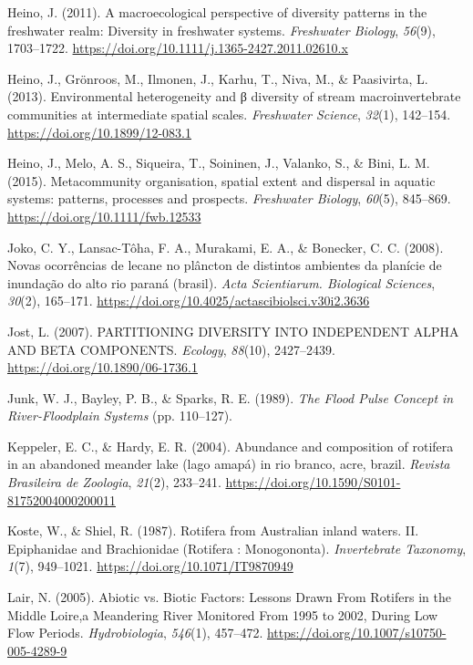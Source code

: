 \documentclass[
  letterpaper,
  DIV=11,
  numbers=noendperiod]{scrartcl}
\newlength{\cslhangindent}
\newenvironment{CSLReferences}[2] %
 {\begin{list}{}{%
  \setlength{\itemindent}{0pt}
  \setlength{\leftmargin}{0pt}
  \setlength{\parsep}{0pt}
  \ifodd #1
   \setlength{\leftmargin}{\cslhangindent}
   \setlength{\itemindent}{-1\cslhangindent}
  \fi
  \setlength{\itemsep}{#2\baselineskip}}}
 {\end{list}}
\begin{document}
\begin{CSLReferences}{1}{0}
Heino, J. (2011). A macroecological perspective of diversity patterns in
the freshwater realm: Diversity in freshwater systems. \emph{Freshwater
Biology}, \emph{56}(9), 1703--1722.
\url{https://doi.org/10.1111/j.1365-2427.2011.02610.x}

Heino, J., Grönroos, M., Ilmonen, J., Karhu, T., Niva, M., \&
Paasivirta, L. (2013). Environmental heterogeneity and β diversity of
stream macroinvertebrate communities at intermediate spatial scales.
\emph{Freshwater Science}, \emph{32}(1), 142--154.
\url{https://doi.org/10.1899/12-083.1}

Heino, J., Melo, A. S., Siqueira, T., Soininen, J., Valanko, S., \&
Bini, L. M. (2015). Metacommunity organisation, spatial extent and
dispersal in aquatic systems: patterns, processes and prospects.
\emph{Freshwater Biology}, \emph{60}(5), 845--869.
\url{https://doi.org/10.1111/fwb.12533}

Joko, C. Y., Lansac-Tôha, F. A., Murakami, E. A., \& Bonecker, C. C.
(2008). Novas ocorrências de lecane no plâncton de distintos ambientes
da planície de inundação do alto rio paraná (brasil). \emph{Acta
Scientiarum. Biological Sciences}, \emph{30}(2), 165--171.
\url{https://doi.org/10.4025/actascibiolsci.v30i2.3636}

Jost, L. (2007). PARTITIONING DIVERSITY INTO INDEPENDENT ALPHA AND BETA
COMPONENTS. \emph{Ecology}, \emph{88}(10), 2427--2439.
\url{https://doi.org/10.1890/06-1736.1}

Junk, W. J., Bayley, P. B., \& Sparks, R. E. (1989). \emph{The Flood
Pulse Concept in River-Floodplain Systems} (pp. 110--127).

Keppeler, E. C., \& Hardy, E. R. (2004). Abundance and composition of
rotifera in an abandoned meander lake (lago amapá) in rio branco, acre,
brazil. \emph{Revista Brasileira de Zoologia}, \emph{21}(2), 233--241.
\url{https://doi.org/10.1590/S0101-81752004000200011}

Koste, W., \& Shiel, R. (1987). Rotifera from Australian inland waters.
II. Epiphanidae and Brachionidae (Rotifera : Monogononta).
\emph{Invertebrate Taxonomy}, \emph{1}(7), 949--1021.
\url{https://doi.org/10.1071/IT9870949}

Lair, N. (2005). Abiotic vs. Biotic Factors: Lessons Drawn From Rotifers
in the Middle Loire,a Meandering River Monitored From 1995 to 2002,
During Low Flow Periods. \emph{Hydrobiologia}, \emph{546}(1), 457--472.
\url{https://doi.org/10.1007/s10750-005-4289-9}


\end{CSLReferences}
\end{document}
